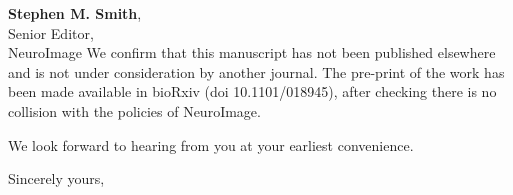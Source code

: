 \documentclass[11pt]{letter} %
\begin{document}
\begin{letter}{\textbf{Stephen M. Smith}, \\
Senior Editor, \\
NeuroImage
}
We confirm that this manuscript has not been published elsewhere and is not under consideration by another journal.
The pre-print of the work has been made available in bioRxiv (doi 10.1101/018945), after checking there
  is no collision with the policies of NeuroImage.

We look forward to hearing from you at your earliest convenience.

\closing{Sincerely yours,}



\vfill
\end{letter}
\end{document}
